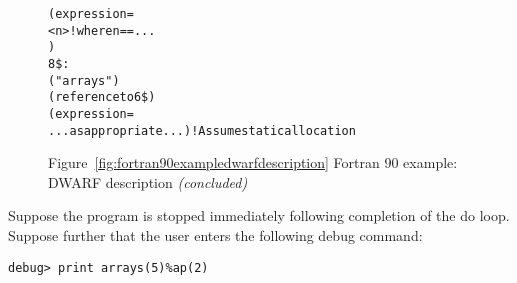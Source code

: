 \begin{figure}
\begin{dwflisting}
\begin{alltt}
            (expression=
                <n>            ! where n == ...
                )
8\$: 
        ("arrays")
        (reference to 6\$)
        (expression=
            ...as appropriate...)       ! Assume static allocation
\end{alltt}
\end{dwflisting}
\begin{center}

Figure~\ref{fig:fortran90exampledwarfdescription} Fortran 90 example: DWARF description \textit{(concluded)}
\end{center}
\end{figure}

Suppose 
the program is stopped immediately following completion
of the do loop. Suppose further that the user enters the
following debug command:

\begin{lstlisting}[numbers=none]
debug> print arrays(5)%ap(2)
\end{lstlisting}

